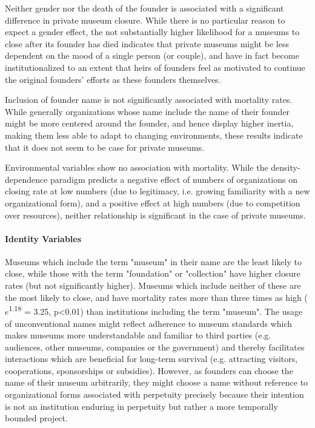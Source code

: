 \documentclass[12pt]{article}
\begin{document}
Neither gender nor the death of the founder is associated with a significant difference in private museum closure.
While there is no particular reason to expect a gender effect, the not substantially higher likelihood for a museums to close after its founder has died indicates that private museums might be less dependent on the mood of a single person (or couple), and have in fact become institutionalized to an extent that heirs of founders feel as motivated to continue the original founders' efforts as these founders themselves.

Inclusion of founder name is not significantly associated with mortality rates.
While generally organizations whose name include the name of their founder might be more centered around the founder, and hence display higher inertia, making them less able to adapt to changing environments, these results indicate that it does not seem to be case for private museums.

Environmental variables show no association with mortality.
While the density-dependence paradigm predicts a negative effect of numbers of organizations on closing rate at low numbers (due to legitimacy, i.e. growing familiarity with a new organizational form), and a positive effect at high numbers (due to competition over resources), neither relationship is significant in the case of private museums.


\paragraph*{Identity Variables}


Museums which include the term "museum" in their name are the least likely to close, while those with the term "foundation" or "collection" have higher closure rates (but not significantly higher).
Museums which include neither of these are the most likely to close, and have mortality rates more than three times as high (\(e\)\textsuperscript{1.18} = 3.25, p<0.01) than institutions including the term "museum".
The usage of unconventional names might reflect adherence to museum standards which makes museums more understandable and familiar to third parties (e.g. audiences, other museums, companies or the government) and thereby facilitates interactions which are beneficial for long-term survival (e.g. attracting visitors, cooperations, sponsorships or subsidies).
However, as founders can choose the name of their museum arbitrarily, they might choose a name without reference to organizational forms associated with perpetuity precisely because their intention is not an institution enduring in perpetuity but rather a more temporally bounded project.
\end{document}

